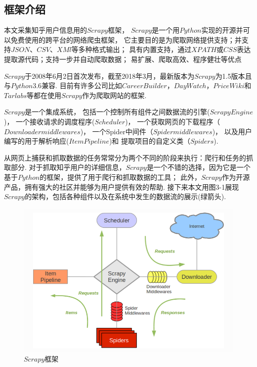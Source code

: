 \documentclass[bachelor,adobefonts]{jnuthesis}
\begin{document}
\subsection{框架介绍}
本文采集知乎用户信息用的$Scrapy$框架，
$Scrapy$是一个用$Python$实现的开源并可以免费使用的跨平台的网络爬虫框架，
它主要目的是为爬取网络提供支持；并支持$JSON$、$CSV$、$XMl$等多种格式输出；
具有内置支持，通过$XPATH$或$CSS$表达提取源代码；支持一步并自动爬取数据；
易扩展、爬取高效、程序健壮等优点

$Scrapy$于2008年6月2日首次发布，截至2018年3月，最新版本为$Scrapy$为1.5版本且与$Python3.6$兼容.
目前有许多公司比如$CareerBuilder$，$DayWatch$，$PriceWiki$和$Tarlabs$等都在使用$Scrapy$作为爬取网站的框架.

$Scrapy$是一个集成系统，
包括一个控制所有组件之间数据流的引擎(\href{https://doc.scrapy.org/en/latest/topics/spiders.html}{$Scrapy Engine$})，
一个接收请求的调度程序(\href{https://doc.scrapy.org/en/latest/}{$Scheduler$})，
一个获取网页的下载程序（\href{https://doc.scrapy.org/en/latest/topics/downloader-middleware.html}{$Downloader middlewares$})，
一个Spider中间件（\href{https://doc.scrapy.org/en/latest/topics/spider-middleware.html}{$Spider middlewares$})，
以及用户编写的用于解析响应(\href{https://doc.scrapy.org/en/latest/topics/items.html}{$Item Pipeline$})和
提取项目的自定义类（\href{https://doc.scrapy.org/en/latest/topics/spiders.html}{$Spiders$}).

从网页上捕获和抓取数据的任务常常分为两个不同的阶段来执行：爬行和任务的抓取部分.
对于抓取知乎用户的详细信息，$Scrapy$是一个不错的选择，因为它是一个基于$Python$的框架，提供了用于爬行和抓取数据的工具；
此外，$Scrapy$作为开源产品，拥有强大的社区并能够为用户提供有效的帮助.
接下来本文用图3-1展现$Scrapy$的架构，包括各种组件以及在系统中发生的数据流的展示(绿箭头).

\begin{figure}[h!]
  \centering
  \includegraphics[width=0.8\linewidth]{Wscrapy.png}
  \caption{$Scrapy$框架}
\end{figure}
\end{document}
